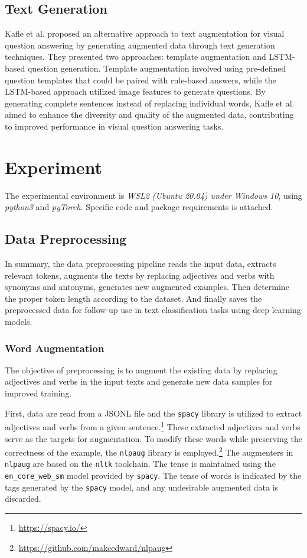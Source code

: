 \documentclass[11pt]{article}
\begin{document}
\subsection{Text Generation}
Kafle et al. proposed an alternative approach to text augmentation for visual question answering by generating augmented data through text generation techniques.\cite{kafle2017data} They presented two approaches: template augmentation and LSTM-based question generation. Template augmentation involved using pre-defined question templates that could be paired with rule-based answers, while the LSTM-based approach utilized image features to generate questions. By generating complete sentences instead of replacing individual words, Kafle et al. aimed to enhance the diversity and quality of the augmented data, contributing to improved performance in visual question answering tasks.


\section{Experiment}

The experimental environment is \textit{WSL2 (Ubuntu 20.04) under Windows 10}, using \textit{python3} and \textit{pyTorch}. Specific code and package requirements is attached.

\subsection{Data Preprocessing}

In summary, the data preprocessing pipeline reads the input data, extracts relevant tokens, augments the texts by replacing adjectives and verbs with synonyms and antonyms, generates new augmented examples. Then determine the proper token length according to the dataset. And finally saves the preprocessed data for follow-up use in text classification tasks using deep learning models.

\subsubsection{Word Augmentation}
The objective of preprocessing is to augment the existing data by replacing adjectives and verbs in the input texts and generate new data samples for improved training.

First, data are read from a JSONL file and the \texttt{spacy} library is utilized to extract adjectives and verbs from a given sentence.\footnote{\url{https://spacy.io/}} These extracted adjectives and verbs serve as the targets for augmentation. To modify these words while preserving the correctness of the example, the \texttt{nlpaug} library is employed.\footnote{\url{https://github.com/makcedward/nlpaug}} The augmenters in \texttt{nlpaug} are based on the \texttt{nltk} toolchain. The tense is maintained using the \texttt{en\_core\_web\_sm} model provided by \texttt{spacy}. The tense of words is indicated by the tags generated by the \texttt{spacy} model, and any undesirable augmented data is discarded.
\end{document}
